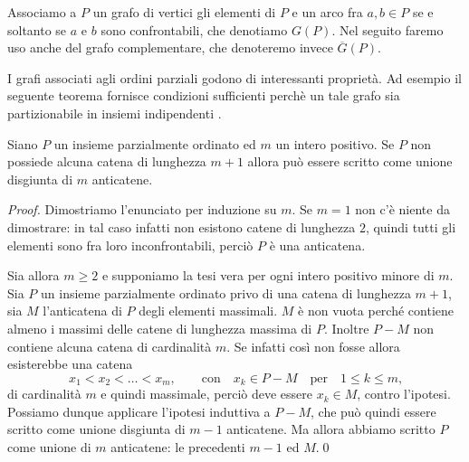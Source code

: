 Associamo a \(P\) un grafo di vertici gli elementi di \(P\) e un arco fra \(a\text{,}\,b\in P\) se e soltanto se \(a\) e \(b\) sono confrontabili, che denotiamo \(G(P)\). Nel seguito faremo uso anche del grafo complementare, che denoteremo invece \(\overline{G}(P)\).

I grafi associati agli ordini parziali godono di interessanti proprietà. Ad esempio il seguente teorema fornisce condizioni sufficienti perchè un tale grafo sia partizionabile in insiemi indipendenti \cite{Mirsky1971}.
\begin{theorem}
  [Mirsky] \label{mirskytheorem} Siano \(P\) un insieme parzialmente ordinato ed \(m\) un intero positivo. Se \(P\) non possiede alcuna catena di lunghezza \(m+1\) allora può essere scritto come unione disgiunta di \(m\) anticatene. 
\end{theorem}
\begin{proof}
  Dimostriamo l'enunciato per induzione su \(m\). Se \(m=1\) non c'è niente da dimostrare: in tal caso infatti non esistono catene di lunghezza \(2\), quindi tutti gli elementi sono fra loro inconfrontabili, perciò \(P\) è una anticatena. 
  
  Sia allora \(m\ge 2\) e supponiamo la tesi vera per ogni intero positivo minore di \(m\). Sia \(P\) un insieme parzialmente ordinato privo di una catena di lunghezza \(m+1\), sia \(M\) l'anticatena di \(P\) degli elementi massimali. \(M\) è non vuota perché contiene almeno i massimi delle catene di lunghezza massima di \(P\). Inoltre \(P-M\) non contiene alcuna catena di cardinalità \(m\). Se infatti così non fosse allora esisterebbe una catena
  \[
    x_1 < x_2 < \dots < x_m,  \qquad\text{con}\quad x_k \in P-M\quad\text{per}\quad 1\le k \le m\text{,}
  \]
  di cardinalità \(m\) e quindi massimale, perciò deve essere \(x_k\in M\), contro l'ipotesi. Possiamo dunque applicare l'ipotesi induttiva a \(P-M\), che può quindi essere scritto come unione disgiunta di \(m-1\) anticatene. Ma allora abbiamo scritto \(P\) come unione di \(m\) anticatene: le precedenti \(m-1\) ed \(M\).\qed
\end{proof}

